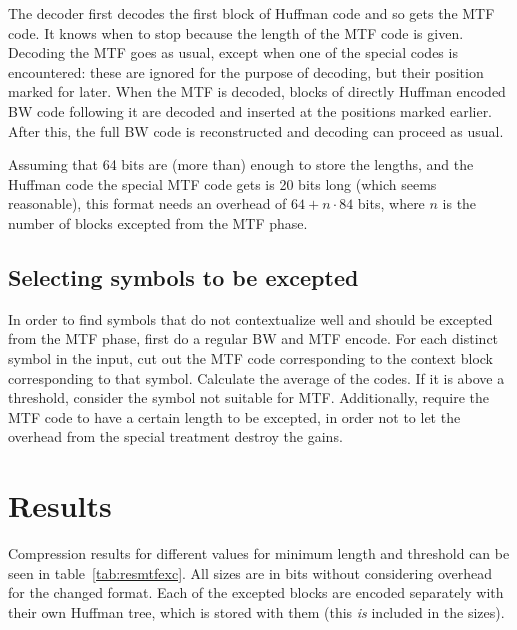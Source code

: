 \documentclass[a4paper]{scrreprt}
\begin{document}
The decoder first decodes the first block of Huffman code and so gets the MTF
code. It knows when to stop because the length of the MTF code is given.
Decoding the MTF goes as usual, except when one of the special codes is
encountered: these are ignored for the purpose of decoding, but their position
marked for later. When the MTF is decoded, blocks of directly Huffman encoded BW
code following it are decoded and inserted at the positions marked earlier.
After this, the full BW code is reconstructed and decoding can proceed as usual.

Assuming that 64 bits are (more than) enough to store the lengths, and the
Huffman code the special MTF code gets is 20 bits long (which seems reasonable),
this format needs an overhead of \(64 + n \cdot 84\) bits, where \(n\) is the
number of blocks excepted from the MTF phase.

\subsection{Selecting symbols to be excepted}

In order to find symbols that do not contextualize well and should be excepted
from the MTF phase, first do a regular BW and MTF encode. For each distinct
symbol in the input, cut out the MTF code corresponding to the context block
corresponding to that symbol. Calculate the average of the codes. If it is above
a threshold, consider the symbol not suitable for MTF. Additionally, require the
MTF code to have a certain length to be excepted, in order not to let the
overhead from the special treatment destroy the gains.

\section{Results}

Compression results for different values for minimum length and threshold can be
seen in table~\ref{tab:resmtfexc}. All sizes are in bits without considering
overhead for the changed format. Each of the excepted blocks are encoded
separately with their own Huffman tree, which is stored with them (this
\emph{is} included in the sizes).
\end{document}
